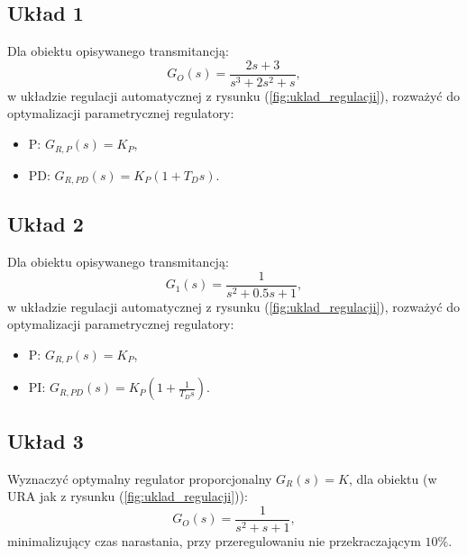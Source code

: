 \documentclass{article}
\begin{document}
    \subsection{Układ 1}
    Dla obiektu opisywanego transmitancją:
    \begin{equation}
        \label{eq:system_1}
        G_{O}(s) = \frac{2s+3}{s^3+2s^2+s},
    \end{equation}
    w układzie regulacji automatycznej z rysunku (\ref{fig:uklad_regulacji}), rozważyć do optymalizacji parametrycznej regulatory:
    \begin{itemize}
        \item P: $G_{R,P}(s) = K_{P}$,
        \item PD: $G_{R,PD}(s) = K_{P}(1 + T_{D}s)$.
    \end{itemize}

    \subsection{Układ 2}
    Dla obiektu opisywanego transmitancją:
    \begin{equation}
        \label{eq:system_2}
        G_{1}(s) = \frac{1}{s^2+0.5s+1},
    \end{equation}
    w układzie regulacji automatycznej z rysunku (\ref{fig:uklad_regulacji}), rozważyć do optymalizacji parametrycznej regulatory:
    \begin{itemize}
        \item P: $G_{R,P}(s) = K_{P}$,
        \item PI: $G_{R,PD}(s) = K_{P}(1 + \frac{1}{T_{D}s})$.
    \end{itemize}

    \subsection{Układ 3}
    Wyznaczyć optymalny regulator proporcjonalny $G_{R}(s) = K$, dla obiektu (w URA jak z rysunku (\ref{fig:uklad_regulacji})):
    $$
        G_{O}(s) = \frac{1}{s^2 + s + 1},
    $$
    minimalizujący czas narastania, przy przeregulowaniu nie przekraczającym $10\%$.
\end{document}
